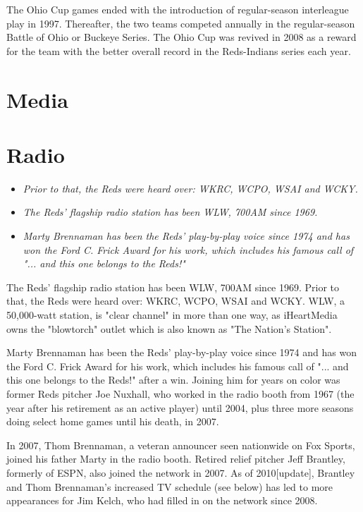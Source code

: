 The Ohio Cup games ended with the introduction of regular-season
interleague play in 1997. Thereafter, the two teams competed annually in
the regular-season Battle of Ohio or Buckeye Series. The Ohio Cup was
revived in 2008 as a reward for the team with the better overall record
in the Reds-Indians series each year.

\section{Media}\label{media}

\section{Radio}\label{radio}

\begin{itemize}
\item
  \emph{Prior to that, the Reds were heard over: WKRC, WCPO, WSAI and
  WCKY.}
\item
  \emph{The Reds' flagship radio station has been WLW, 700AM since
  1969.}
\item
  \emph{Marty Brennaman has been the Reds' play-by-play voice since 1974
  and has won the Ford C. Frick Award for his work, which includes his
  famous call of "... and this one belongs to the Reds!"}
\end{itemize}

The Reds' flagship radio station has been WLW, 700AM since 1969. Prior
to that, the Reds were heard over: WKRC, WCPO, WSAI and WCKY. WLW, a
50,000-watt station, is "clear channel" in more than one way, as
iHeartMedia owns the "blowtorch" outlet which is also known as "The
Nation's Station".

Marty Brennaman has been the Reds' play-by-play voice since 1974 and has
won the Ford C. Frick Award for his work, which includes his famous call
of "... and this one belongs to the Reds!" after a win. Joining him for
years on color was former Reds pitcher Joe Nuxhall, who worked in the
radio booth from 1967 (the year after his retirement as an active
player) until 2004, plus three more seasons doing select home games
until his death, in 2007.

In 2007, Thom Brennaman, a veteran announcer seen nationwide on Fox
Sports, joined his father Marty in the radio booth. Retired relief
pitcher Jeff Brantley, formerly of ESPN, also joined the network in
2007. As of 2010{[}update{]}, Brantley and Thom Brennaman's increased TV
schedule (see below) has led to more appearances for Jim Kelch, who had
filled in on the network since 2008.

